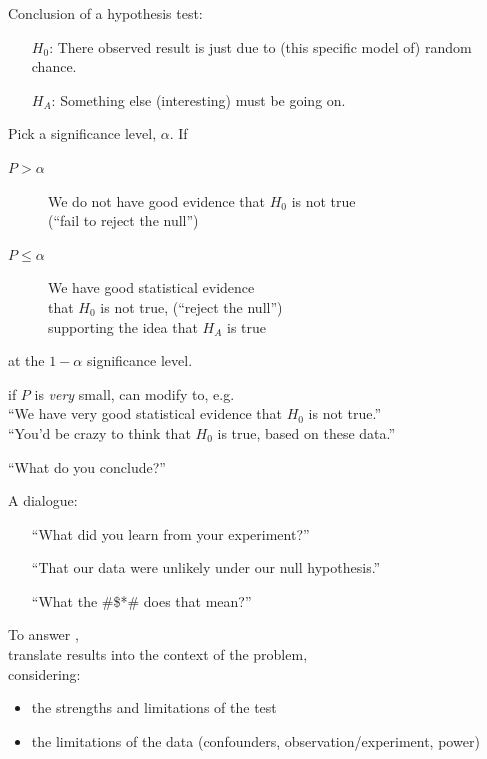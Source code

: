 \begin{frame}{Conclusion of a hypothesis test:}
    \begin{itemize}
        \item[$H_0$:] There observed result is just due to (this specific model of) random chance.
        \item[$H_A$:] Something else (interesting) must be going on.
    \end{itemize}
    \pause
    \vfill

    Pick a \alert{significance level}, $\alpha$.  If
    \begin{description}
        \item[$P > \alpha$] We do not have good evidence that $H_0$ is not true\\
            (``fail to reject the null'')
        \item[$P \le \alpha$] We have good statistical evidence \\
            that $H_0$ is not true,
            (``reject the null'')\\
            supporting the idea that $H_A$ is true
    \end{description}
    at the $1-\alpha$ significance level.
    \pause
    \vfill

     if $P$ is \emph{very} small,
    can modify to, e.g.\\
    ``We have very good statistical evidence that $H_0$ is not true.''\\
    \pause
    ``You'd be crazy to think that $H_0$ is true, based on these data.''

\end{frame}

\begin{frame}{``What do you conclude?''}

    A dialogue:
    \begin{itemize}
        \item[] ``What did you learn from your experiment?''
            \pause
        \item[] ``That our data were unlikely under our null hypothesis.''
            \pause
        \item[] ``What the \@\#\$*\@\# does that mean?''
    \end{itemize}
    \pause
    \vspace{2em}

    To answer ,\\
    \alert{translate} results into the context of the problem,\\
    considering:
    \begin{itemize}
        \item the strengths and limitations of the test
        \item the limitations of the data (confounders, observation/experiment, power)
    \end{itemize}


\end{frame}


